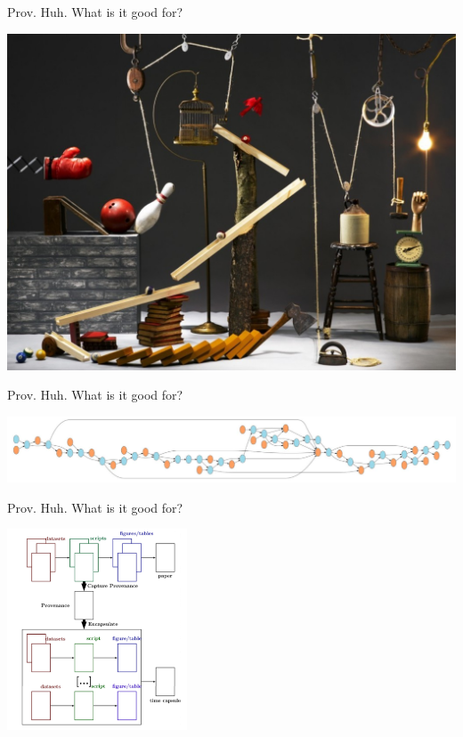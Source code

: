 \documentclass[ignorenonframetext,]{beamer}
\begin{document}
\begin{frame}{Prov. Huh. What is it good for?}
\protect\hypertarget{prov.-huh.-what-is-it-good-for-1}{}

\includegraphics{rgm.jpg}

\end{frame}

\begin{frame}{Prov. Huh. What is it good for?}
\protect\hypertarget{prov.-huh.-what-is-it-good-for-2}{}

\includegraphics[width=1\textwidth,height=\textheight]{messy1.png}

\end{frame}

\begin{frame}{Prov. Huh. What is it good for?}
\protect\hypertarget{prov.-huh.-what-is-it-good-for-3}{}

\includegraphics[width=0.4\textwidth,height=\textheight]{cise2.png}

\end{frame}
\end{document}
